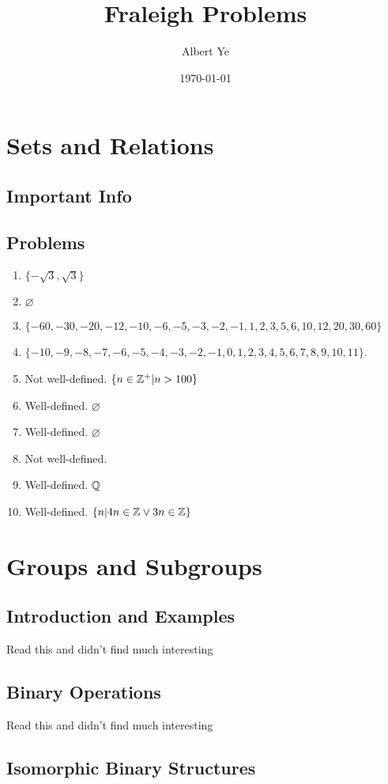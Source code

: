 \documentclass{article}
\title{Fraleigh Problems}
\author{Albert Ye}
\date{\today}
\begin{document}
\maketitle
\section{Sets and Relations}
\subsection{Important Info}
\subsection{Problems}
\begin{enumerate}
    \item $\{-\sqrt{3}, \sqrt{3}\}$
    \item $\varnothing$
    \item $\{-60, -30, -20, -12, -10, -6, -5, -3, -2, -1, 1, 2, 3, 5, 6, 10, 12, 20, 30, 60\}$
    \item $\{-10, -9, -8, -7, -6, -5, -4, -3, -2, -1, 0, 1, 2, 3, 4, 5, 6, 7, 8, 9, 10, 11\}$.
    \item Not well-defined. $\{n \in \mathbb{Z}^+ | n > 100\}$
    \item Well-defined. $\varnothing$
    \item Well-defined. $\varnothing$
    \item Not well-defined.
    \item Well-defined. $\mathbb{Q}$
    \item Well-defined. $\{n | 4n \in \mathbb{Z} \lor 3n \in \mathbb{Z}\}$
\end{enumerate}
\section{Groups and Subgroups}
\subsection{Introduction and Examples}
Read this and didn't find much interesting
\subsection{Binary Operations}
Read this and didn't find much interesting 
\subsection{Isomorphic Binary Structures}
\end{document}
